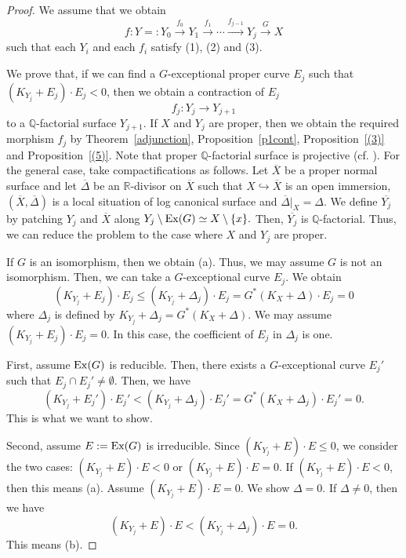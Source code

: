 \documentclass[12pt,twoside]{amsart}
\theoremstyle{definition}
\newcommand{\Q}{$\mathbb{Q}$}
\newcommand{\R}{$\mathbb{R}$}
\begin{document}
\begin{proof}
We assume that we obtain 
$$f:Y=:Y_0\overset{f_0}\to Y_1\overset{f_1}\to\cdots\overset{f_{j-1}}\to Y_j\overset{G}\to X$$ 
such that 
each $Y_i$ and each $f_i$ satisfy (1), (2) and (3). 

We prove that, if we can find a $G$-exceptional proper curve $E_j$ such that 
$(K_{Y_j}+E_j)\cdot E_j<0$, then 
we obtain a contraction of $E_j$ 
$$f_j:Y_j\to Y_{j+1}$$
to a \Q-factorial surface $Y_{j+1}$. 
If $X$ and $Y_j$ are proper, then we obtain the required morphism $f_j$
by Theorem~\ref{adjunction}, Proposition~\ref{p1cont}, Proposition~\ref{(3)} and 
Proposition~\ref{(5)}. 
Note that proper \Q-factorial surface is projective (cf. \cite[Lemma~2.2]{Fujino}). 
For the general case, take compactifications as follows. 
Let $\overline X$ be a proper normal surface and 
let $\overline \Delta$ be an \R-divisor on $\overline X$ such that 
$X\hookrightarrow \overline X$ is an open immersion, 
$(\overline X, \overline \Delta)$ is a local situation of log canonical surface and $\overline \Delta|_X=\Delta.$ 
We define $\overline{Y_j}$ by patching $Y_j$ and $\overline X$ along 
$Y_j\setminus {\rm Ex}(G)\simeq X\setminus \{x\}.$ 
Then, $\overline{Y_j}$ is \Q-factorial. 
Thus, we can reduce the problem to the case where $X$ and $Y_j$ are proper. 

If $G$ is an isomorphism, then we obtain (a). 
Thus, we may assume $G$ is not an isomorphism. 
Then, we can take a $G$-exceptional curve $E_j$. 
We obtain 
$$(K_{Y_j}+E_j)\cdot E_j\leq (K_{Y_j}+\Delta_j)\cdot E_j
=G^*(K_X+\Delta)\cdot E_j=0$$ 
where $\Delta_j$ is defined by $K_{Y_j}+\Delta_j=G^*(K_X+\Delta)$. 
We may assume $(K_{Y_j}+E_j)\cdot E_j=0$. 
In this case, the coefficient of $E_j$ in $\Delta_j$ is one. 

First, assume ${\rm Ex}(G)$ is reducible. 
Then, there exists a $G$-exceptional curve $E_j'$ 
such that $E_j \cap E_j'\neq \emptyset.$
Then, we have 
$$(K_{Y_j}+E_j')\cdot E_j'<(K_{Y_j}+\Delta_j)\cdot E_j'
=G^*(K_X+\Delta_j)\cdot E_j'=0.$$ 
This is what we want to show. 

Second, assume $E:={\rm Ex}(G)$ is irreducible. 
Since $(K_{Y_j}+E)\cdot E\leq 0$, we consider the two cases: 
$(K_{Y_j}+E)\cdot E<0$ or $(K_{Y_j}+E)\cdot E=0$. 
If $(K_{Y_j}+E)\cdot E<0$, then this means (a). 
Assume $(K_{Y_j}+E)\cdot E=0$. 
We show $\Delta=0$. 
If $\Delta\neq 0$, then we have
$$(K_{Y_j}+E)\cdot E<(K_{Y_j}+\Delta_j)\cdot E=0.$$ 
This means (b). 
\end{proof}
\end{document}
